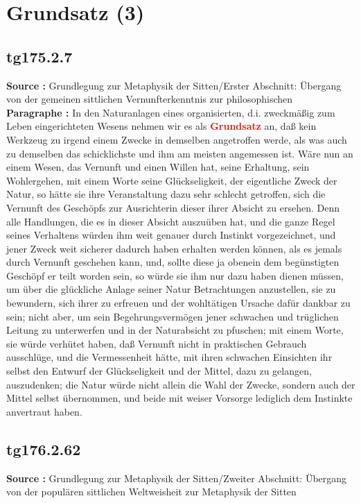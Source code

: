 \documentclass[a4paper,12pt,twoside]{book}
\newcommand{\match}[1]{\textcolor{red}{\textbf{#1}}}
\newcommand{\unnumberedsection}[1]{
	\section*{#1}
	\addcontentsline{toc}{section}{#1}
	\markright{#1}
}
\begin{document}
	\unnumberedsection{Grundsatz (3)} 
	\subsection*{tg175.2.7} 
	\textbf{Source : }Grundlegung zur Metaphysik der Sitten/Erster Abschnitt: Übergang von der gemeinen sittlichen Vernunfterkenntnis zur philosophischen\\  
	
	\noindent\textbf{Paragraphe : }In den Naturanlagen eines organisierten, d.i. zweckmäßig zum Leben eingerichteten Wesens nehmen wir es als \match{Grundsatz} an, daß kein Werkzeug zu irgend einem Zwecke in demselben angetroffen werde, als was auch zu demselben das schicklichste und ihm am meisten angemessen ist. Wäre nun an einem Wesen, das Vernunft und einen Willen hat, seine Erhaltung, sein Wohlergehen, mit einem Worte seine Glückseligkeit, der eigentliche Zweck der Natur, so hätte sie ihre Veranstaltung dazu sehr schlecht getroffen, sich die Vernunft des Geschöpfs zur Ausrichterin dieser ihrer Absicht zu ersehen. Denn alle Handlungen, die es in dieser Absicht auszuüben hat, und die ganze Regel seines Verhaltens würden ihm weit genauer durch Instinkt vorgezeichnet, und jener Zweck weit sicherer dadurch haben erhalten werden können, als es jemals durch Vernunft geschehen kann, und, sollte diese ja obenein dem begünstigten Geschöpf er teilt worden sein, so würde sie ihm nur dazu haben dienen müssen, um über die glückliche Anlage seiner Natur Betrachtungen anzustellen, sie zu bewundern, sich ihrer zu erfreuen und der wohltätigen Ursache dafür dankbar zu sein; nicht aber, um sein Begehrungsvermögen jener schwachen und trüglichen Leitung zu unterwerfen und in der Naturabsicht zu pfuschen; mit einem Worte, sie würde verhütet haben, daß Vernunft nicht in praktischen Gebrauch ausschlüge, und die Vermessenheit hätte, mit ihren schwachen Einsichten ihr selbst den Entwurf der Glückseligkeit und der Mittel, dazu zu gelangen, auszudenken; die Natur würde nicht allein die Wahl der Zwecke, sondern auch der Mittel selbst übernommen, und beide mit weiser Vorsorge lediglich dem Instinkte anvertraut haben. 
	
	\subsection*{tg176.2.62} 
	\textbf{Source : }Grundlegung zur Metaphysik der Sitten/Zweiter Abschnitt: Übergang von der populären sittlichen Weltweisheit zur Metaphysik der Sitten\\  
	
\end{document}
